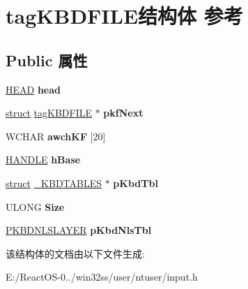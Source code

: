 \hypertarget{structtag_k_b_d_f_i_l_e}{}\section{tag\+K\+B\+D\+F\+I\+L\+E结构体 参考}
\label{structtag_k_b_d_f_i_l_e}
\subsection*{Public 属性}
\begin{DoxyCompactItemize}
\item 
\mbox{\label{structtag_k_b_d_f_i_l_e_aeb10513dc2c2b2db3ea0b08a056cdc2b}} 
\hyperlink{struct___h_e_a_d}{H\+E\+AD} {\bfseries head}
\item 
\mbox{\label{structtag_k_b_d_f_i_l_e_a8d56283ad010937785be8f8fa626c083}} 
\hyperlink{interfacestruct}{struct} \hyperlink{structtag_k_b_d_f_i_l_e}{tag\+K\+B\+D\+F\+I\+LE} $\ast$ {\bfseries pkf\+Next}
\item 
\mbox{\label{structtag_k_b_d_f_i_l_e_af3bc8b056913943e366da19835090738}} 
W\+C\+H\+AR {\bfseries awch\+KF} \mbox{[}20\mbox{]}
\item 
\mbox{\label{structtag_k_b_d_f_i_l_e_a4b67d20a7bf77fa3208afbf9fbc4a375}} 
\hyperlink{interfacevoid}{H\+A\+N\+D\+LE} {\bfseries h\+Base}
\item 
\mbox{\label{structtag_k_b_d_f_i_l_e_a6ae62eb49984453592ddb246e3fb2a79}} 
\hyperlink{interfacestruct}{struct} \hyperlink{struct___k_b_d_t_a_b_l_e_s}{\+\_\+\+K\+B\+D\+T\+A\+B\+L\+ES} $\ast$ {\bfseries p\+Kbd\+Tbl}
\item 
\mbox{\label{structtag_k_b_d_f_i_l_e_a2bc6748ac73086610ffc5138867a03d0}} 
U\+L\+O\+NG {\bfseries Size}
\item 
\mbox{\label{structtag_k_b_d_f_i_l_e_a7580aa96a793a6da9d8895c7da8ef270}} 
\hyperlink{structtag_k_b_d_n_l_s_l_a_y_e_r}{P\+K\+B\+D\+N\+L\+S\+L\+A\+Y\+ER} {\bfseries p\+Kbd\+Nls\+Tbl}
\end{DoxyCompactItemize}


该结构体的文档由以下文件生成\+:\begin{DoxyCompactItemize}
\item 
E\+:/\+React\+O\+S-\/0../win32ss/user/ntuser/input.\+h\end{DoxyCompactItemize}
